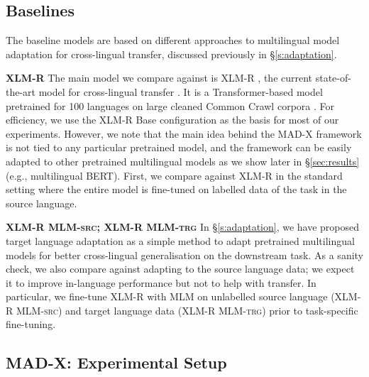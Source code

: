 \documentclass[11pt,a4paper]{article}
\newcommand{\model}[1]{\textsc{MAD-X}}
\newcommand{\xlmr}[1]{\textsc{XLM-R}}
\newcommand{\mlmsrc}[1]{\textsc{XLM-R MLM-src}}
\newcommand{\mlmtrg}[1]{\textsc{XLM-R MLM-trg}}
\begin{document}
\subsection{Baselines}
The baseline models are based on different approaches to multilingual model adaptation for cross-lingual transfer, discussed previously in \S\ref{s:adaptation}.

\vspace{1.8mm}
\noindent \textbf{\xlmr{}}\hspace{0.3mm}
The main model we compare against is XLM-R \cite{Conneau2020xlm-r}, the current state-of-the-art model for cross-lingual transfer \cite{Hu2020xtreme}. It is a Transformer-based model pretrained for 100 languages on large cleaned Common Crawl corpora \cite{Wenzek:2019arxiv}. For efficiency, we use the XLM-R Base configuration as the basis for most of our experiments. However, we note that the main idea behind the \model{} framework is not tied to any particular pretrained model, and the framework can be easily adapted to other pretrained multilingual models as we show later in \S\ref{sec:results} (e.g., multilingual BERT).
First, we compare against XLM-R in the standard setting where the entire model is fine-tuned on labelled data of the task in the source language. 



\vspace{1.8mm}
\noindent \textbf{\mlmsrc{}; \mlmtrg{}}\hspace{0.3mm} 
In \S\ref{s:adaptation}, we have proposed target language adaptation as a simple method to adapt pretrained multilingual models for better cross-lingual generalisation on the downstream task. As a sanity check, we also compare against adapting to the source language data; we expect it to improve in-language performance but not to help with transfer. In particular, we fine-tune XLM-R with MLM on unlabelled source language (\mlmsrc{}) and target language data (\mlmtrg{}) prior to task-specific fine-tuning. 

 

\subsection{ \model{}: Experimental Setup}
\end{document}
